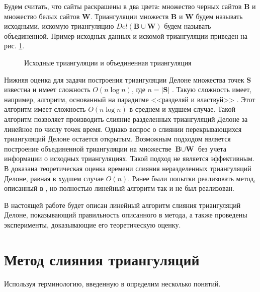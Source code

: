 \documentclass[12pt]{article}
\begin{document}
Будем считать, что сайты раскрашены в два цвета: множество черных сайтов $\textbf{B}$ и множество белых сайтов $\textbf{W}$.
Триангуляции множеств $\textbf{B}$ и $\textbf{W}$ будем называть исходными,
искомую триангуляцию $Del(\textbf{B} \cup \textbf{W})$ будем называть объединенной.
Пример исходных данных и искомой триангуляции приведен на рис. \ref{pic:model_data}.

\begin{figure}[htb!]
	\begin{minipage}[h]{0.49\linewidth}
	\end{minipage}
	\hfill
	\begin{minipage}[h]{0.49\linewidth}
	\end{minipage}
	\caption{Исходные триангуляции и объединенная триангуляция}
	\label{pic:model_data}
\end{figure}

Нижняя оценка для задачи построения триангуляции Делоне множества точек $\textbf{S}$ известна
и имеет сложность $O(n\log n)$, где $n = |\textbf{S}|$ \cite[лекции 10-11]{Lectures}.
Такую сложность имеет, например, алгоритм, основанный на парадигме <<разделяй и властвуй>> \cite[стр.44-45]{Skvortsov}.
Этот алгоритм имеет сложность $O(n\log n)$ в среднем и худшем случае.
Такой алгоритм позволяет производить слияние разделенных триангуляций Делоне за линейное по числу точек время.
Однако вопрос о слиянии перекрывающихся триангуляций Делоне остается открытым.
Возможным подходом является построение объединенной триангуляции на множестве $\textbf{B} \cup \textbf{W}$
без учета информации о исходных триангуляциях.
Такой подход не является эффективным.
В \cite{MestOverlap} доказана теоретическая оценка времени слияния неразделенных триангуляций Делоне, равная в худшем случае $O(n)$.
Ранее были попытки реализовать метод, описанный в \cite{MestOverlap},
но полностью линейный алгоритм так и не был реализован.

В настоящей работе будет описан линейный алгоритм слияния триангуляций Делоне,
показывающий правильность описанного в \cite{MestOverlap} метода,
а также проведены эксперименты, доказывающие его теоретическую оценку.

\section{Метод слияния триангуляций}
Используя терминологию, введенную в \cite{MestOverlap} определим несколько понятий.
\end{document}
